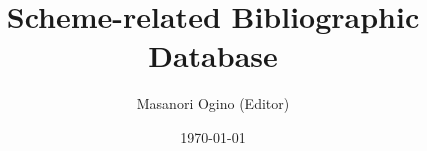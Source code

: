 \documentclass[a4paper]{scrartcl}
\title{Scheme-related Bibliographic Database}
\author{Masanori Ogino (Editor)}
\date{\today}
\begin{document}
\maketitle
\nocite{*}
\printbibliography
\end{document}
